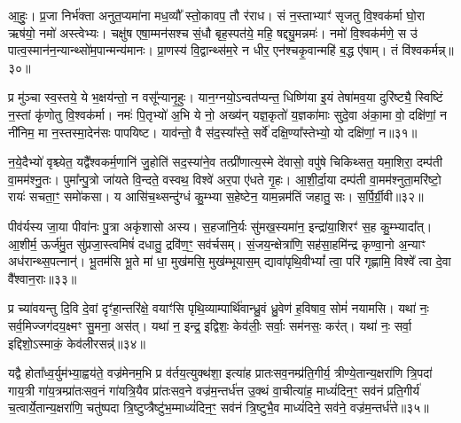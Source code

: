 आ॒हुः॒। प्र॒जा निर्भ॑क्ता अनुत॒प्यमा॑ना मध॒व्यौ᳚ स्तो॒कावप॒ तौ र॑राध। सं न॒स्ताभ्याꣳ॑ सृजतु वि॒श्वक॑र्मा घो॒रा ऋष॑यो॒ नमो॑ अस्त्वेभ्यः। चक्षु॑ष एषा॒म्मन॑सश्च सं॒धौ बृह॒स्पत॑ये॒ महि॒ षद्द्यु॒मन्नमः॑। नमो॑ वि॒श्वक॑र्मणे॒ स उ॑ पात्व॒स्मान॑न॒न्यान्थ्सो॑म॒पान्मन्य॑मानः। प्रा॒णस्य॑ वि॒द्वान्थ्स॑म॒रे न धीर॒ एन॑श्चकृ॒वान्महि॑ ब॒द्ध ए॑षाम्। तं वि॑श्वकर्मन्न्॥३०॥

प्र मु॑ञ्चा स्व॒स्तये॒ ये भ॒क्षय॑न्तो॒ न वसू᳚न्यानृ॒हुः। यान॒ग्नयो॒\-ऽन्वत॑प्यन्त॒ धिष्णि॑या इ॒यं तेषा॑मव॒या दुरि॑ष्ट्यै॒ स्विष्टिं न॒स्तां कृ॑णोतु वि॒श्वक॑र्मा। नमः॑ पि॒तृभ्यो॑ अ॒भि ये नो॒ अख्य॑न् यज्ञ॒कृतो॑ य॒ज्ञका॑माः सुदे॒वा अ॑का॒मा वो॒ दक्षि॑णां॒ न नी॑निम॒ मा न॒स्तस्मा॒देन॑सः पापयिष्ट। याव॑न्तो॒ वै स॑द॒स्या᳚स्ते॒ सर्वे॑ दक्षि॒ण्या᳚स्तेभ्यो॒ यो दक्षि॑णां॒ न॥३१॥

न॒ये॒दैभ्यो॑ वृश्च्येत॒ यद्वै᳚श्वकर्म॒णानि॑ जु॒होति॑ सद॒स्या॑ने॒व तत्प्री॑णात्य॒स्मे दे॑वासो॒ वपु॑षे चिकिथ्सत॒ यमा॒शिरा॒ दम्प॑ती वा॒मम॑श्नु॒तः। पुमा᳚न्पु॒त्रो जा॑यते वि॒न्दते॒ वस्वथ॒ विश्वे॑ अर॒पा ए॑धते गृ॒हः। आ॒शी॒र्दा॒या दम्प॑ती वा॒मम॑श्नुता॒मरि॑ष्टो॒ रायः॑ सचता॒ꣳ॒ समो॑कसा। य आसि॑च॒थ्सन्दु॑ग्धं कु॒म्भ्या स॒हेष्टेन॒ याम॒न्नम॑तिं जहातु॒ सः। स॒र्पि॒र्ग्री॒वी॥३२॥


पीव॑र्यस्य जा॒या पीवा॑नः पु॒त्रा अकृ॑शासो अस्य। स॒हजा॑नि॒र्यः सु॑मख॒स्यमा॑न॒ इन्द्रा॑या॒शिरꣳ॑ स॒ह कु॒म्भ्यादा᳚त्। आ॒शीर्म॒ ऊर्ज॑मु॒त सु॑प्रजा॒स्त्वमिषं॑ दधातु॒ द्रवि॑ण॒ꣳ॒ सव॑र्चसम्। सं॒जय॒न्क्षेत्रा॑णि॒ सह॑सा॒हमि॑न्द्र कृण्वा॒नो अ॒न्याꣳ अध॑रान्थ्स॒पत्नान्॑। भू॒तम॑सि भू॒ते मा॑ धा॒ मुख॑मसि॒ मुख॑म्भूयास॒म् द्यावा॑पृथि॒वी\-भ्यां᳚ त्वा॒ परि॑ गृह्णामि॒ विश्वे᳚ त्वा दे॒वा वै᳚श्वान॒राः॥३३॥

प्र च्या॑वयन्तु दि॒वि दे॒वां दृꣳ॑हा॒न्तरि॑क्षे॒ वयाꣳ॑सि पृथि॒व्याम्पार्थि॑वान्ध्रु॒वं ध्रु॒वेण॑ ह॒विषाव॒ सोमं॑ नयामसि। यथा॑ नः॒ सर्व॒मिज्जग॑दय॒क्ष्मꣳ सु॒मना॒ अस॑त्। यथा॑ न॒ इन्द्र॒ इद्विशः॒ केव॑लीः॒ सर्वाः॒ सम॑नसः॒ कर॑त्। यथा॑ नः॒ सर्वा॒ इद्दिशो॒\-ऽस्माकं॒ केव॑लीरसन्न्॑॥३४॥

{\anuvakamend[{एन॑सा विश्वकर्म॒न् यो दक्षि॑णां॒ न स॑र्पिर्ग्री॒वी वै᳚श्वान॒राश्च॑त्वारि॒ꣳ॒शच्च॑॥८॥}]}

यद्वै होता᳚ध्व॒र्युम॑भ्या॒ह्वय॑ते॒ वज्र॑मेनम॒भि प्र व॑र्तय॒त्युक्थ॑शा॒ इत्या॑ह प्रातःसव॒नम्प्र॑ति॒गीर्य॒ त्रीण्ये॒तान्य॒क्षरा॑णि त्रि॒पदा॑ गाय॒त्री गा॑य॒त्रम्प्रा॑तःसव॒नं गा॑यत्रि॒यैव प्रा॑तःसव॒ने वज्र॑म॒न्तर्ध॑त्त उ॒क्थं वा॒चीत्या॑ह॒ माध्यं॑दिन॒ꣳ॒ सव॑नं प्रति॒गीर्य॑ च॒त्वार्ये॒तान्य॒क्षरा॑णि॒ चतु॑ष्पदा त्रि॒ष्टुप्त्रैष्टु॑भ॒म्माध्यं॑दिन॒ꣳ॒ सव॑नं त्रि॒ष्टुभै॒व माध्यं॑दिने॒ सव॑ने॒ वज्र॑म॒न्तर्ध॑त्ते॥३५॥

